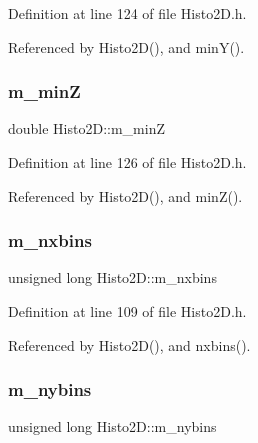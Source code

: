 Definition at line 124 of file Histo2\+D.\+h.



Referenced by Histo2\+D(), and min\+Y().

\mbox{\label{classHisto2D_a6cfa2290ee0d786b37f7ed08129c60e3}} 
\subsubsection{\texorpdfstring{m\+\_\+minZ}{m\_minZ}}
{\footnotesize\ttfamily double Histo2\+D\+::m\+\_\+minZ\hspace{0.3cm}{\ttfamily [private]}}



Definition at line 126 of file Histo2\+D.\+h.



Referenced by Histo2\+D(), and min\+Z().

\mbox{\label{classHisto2D_a39a9d29010bf81c546a1ad1b01f7cb43}} 
\subsubsection{\texorpdfstring{m\+\_\+nxbins}{m\_nxbins}}
{\footnotesize\ttfamily unsigned long Histo2\+D\+::m\+\_\+nxbins\hspace{0.3cm}{\ttfamily [private]}}



Definition at line 109 of file Histo2\+D.\+h.



Referenced by Histo2\+D(), and nxbins().

\mbox{\label{classHisto2D_afebeb164369fa9cea59f226d71907e3d}} 
\subsubsection{\texorpdfstring{m\+\_\+nybins}{m\_nybins}}
{\footnotesize\ttfamily unsigned long Histo2\+D\+::m\+\_\+nybins\hspace{0.3cm}{\ttfamily [private]}}



